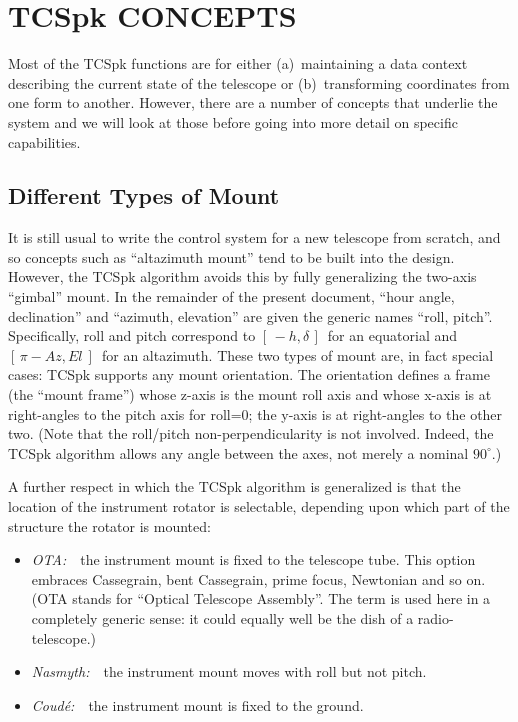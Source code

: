 \documentclass[12pt,fleqn,twoside]{article}
\renewcommand{\_}{{\tt\char'137}}     %
\newcommand{\mhadec}     {$[\,-h,\delta\,]$}
\newcommand{\mazel}      {$[\,\pi\!-\!Az,El~]$}
\begin{document}
\newpage
\section{TCSpk CONCEPTS}

Most of the TCSpk functions are for either (a)~maintaining a data
context describing the current state of the telescope
or (b)~transforming coordinates from one form to another.  However,
there are a number of concepts that underlie the system and we
will look at those before going into more detail on specific
capabilities.

\subsection{Different Types of Mount}

It is still usual to write the control system for a new telescope
from scratch, and so concepts such as ``altazimuth mount''
tend to be built into the design.  However, the TCSpk algorithm
avoids this by fully generalizing the two-axis ``gimbal'' mount.
In the remainder of the present document, ``hour angle, declination''
and ``azimuth, elevation'' are given the generic names ``roll,
pitch''.  Specifically, roll and pitch correspond to \mhadec\ for
an equatorial and \mazel\ for an altazimuth. These two types of
mount are, in fact special cases: TCSpk supports any
mount orientation.  The orientation defines a frame (the ``mount
frame'') whose z-axis is the mount roll axis and whose x-axis is
at right-angles to the pitch axis for roll=0;  the y-axis is at
right-angles to the other two.  (Note that the roll/pitch
non-perpendicularity is not involved.  Indeed, the TCSpk algorithm
allows any angle between the axes, not merely a nominal $90^\circ$.)

A further respect in which the TCSpk algorithm is generalized
is that the location of the instrument rotator is selectable,
depending upon which part of the structure the rotator is mounted:
\begin{itemize}

\item {\it OTA:}~~the instrument mount is fixed to the telescope
tube. This option embraces Cassegrain, bent Cassegrain, prime
focus, Newtonian and so on. (OTA stands for ``Optical Telescope
Assembly''.  The term is used here in a completely generic sense:
it could equally well be the dish of a radio-telescope.)

\item {\it Nasmyth:}~~the instrument mount moves with roll but not
pitch.

\item {\it Coud\'{e}:}~~the instrument mount is fixed to the
ground.

\end{itemize}
\end{document}
